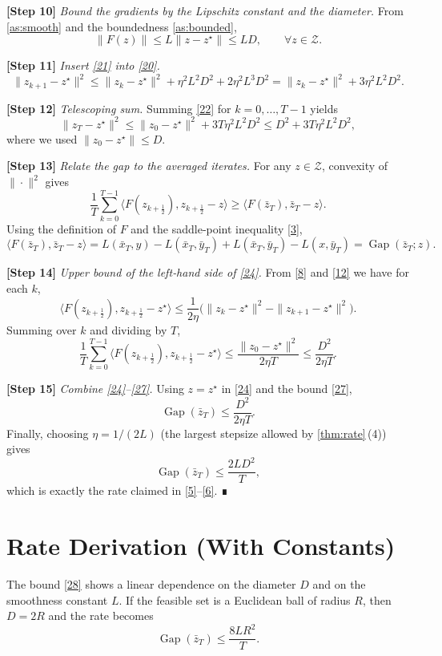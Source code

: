 \documentclass{article}
\newcommand{\gap}{\operatorname{Gap}}
\begin{document}
\noindent\textbf{[Step 10]} \emph{Bound the gradients by the Lipschitz constant and the diameter.}  
From \eqref{as:smooth} and the boundedness \eqref{as:bounded},
\[
\|F(z)\|\le L\|z-z^{\star}\|\le LD,\qquad\forall z\in\mathcal{Z}.
\tag{21}
\]

\noindent\textbf{[Step 11]} \emph{Insert \eqref{21} into \eqref{20}.}  
\[
\|z_{k+1}-z^{\star}\|^{2}
\le\|z_{k}-z^{\star}\|^{2}
   +\eta^{2}L^{2}D^{2}+2\eta^{2}L^{3}D^{2}
   =\|z_{k}-z^{\star}\|^{2}+3\eta^{2}L^{2}D^{2}.
\tag{22}
\]

\noindent\textbf{[Step 12]} \emph{Telescoping sum.}  
Summing \eqref{22} for $k=0,\dots,T-1$ yields
\[
\|z_{T}-z^{\star}\|^{2}
\le\|z_{0}-z^{\star}\|^{2}+3T\eta^{2}L^{2}D^{2}
\le D^{2}+3T\eta^{2}L^{2}D^{2},
\tag{23}
\]
where we used $\|z_{0}-z^{\star}\|\le D$.

\noindent\textbf{[Step 13]} \emph{Relate the gap to the averaged iterates.}  
For any $z\in\mathcal{Z}$, convexity of $\|\cdot\|^{2}$ gives
\[
\frac{1}{T}\sum_{k=0}^{T-1}\langle F(z_{k+\frac12}),z_{k+\frac12}-z\rangle
\ge\langle F(\bar z_{T}),\bar z_{T}-z\rangle.
\tag{24}
\]
Using the definition of $F$ and the saddle‑point inequality \eqref{3},
\[
\langle F(\bar z_{T}),\bar z_{T}-z\rangle
= L(\bar x_{T},y)-L(\bar x_{T},\bar y_{T})
   +L(\bar x_{T},\bar y_{T})-L(x,\bar y_{T})
   =\gap(\bar z_{T};z).
\tag{25}
\]

\noindent\textbf{[Step 14]} \emph{Upper bound of the left‑hand side of \eqref{24}.}  
From \eqref{8} and \eqref{12} we have for each $k$,
\[
\langle F(z_{k+\frac12}),z_{k+\frac12}-z^{\star}\rangle
\le\frac{1}{2\eta}\bigl(\|z_{k}-z^{\star}\|^{2}
                         -\|z_{k+1}-z^{\star}\|^{2}\bigr).
\tag{26}
\]
Summing over $k$ and dividing by $T$,
\[
\frac{1}{T}\sum_{k=0}^{T-1}\langle F(z_{k+\frac12}),z_{k+\frac12}-z^{\star}\rangle
\le\frac{\|z_{0}-z^{\star}\|^{2}}{2\eta T}
\le\frac{D^{2}}{2\eta T}.
\tag{27}
\]

\noindent\textbf{[Step 15]} \emph{Combine \eqref{24}–\eqref{27}.}  
Using $z=z^{\star}$ in \eqref{24} and the bound \eqref{27},
\[
\gap(\bar z_{T})\le\frac{D^{2}}{2\eta T}.
\tag{28}
\]
Finally, choosing $\eta=1/(2L)$ (the largest stepsize allowed by \eqref{thm:rate}\,(4)) gives
\[
\gap(\bar z_{T})\le\frac{2L D^{2}}{T},
\]
which is exactly the rate claimed in \eqref{5}–\eqref{6}. ∎

\section*{Rate Derivation (With Constants)}
The bound \eqref{28} shows a linear dependence on the diameter $D$ and on the smoothness constant $L$.  
If the feasible set is a Euclidean ball of radius $R$, then $D=2R$ and the rate becomes
\[
\gap(\bar z_{T})\le\frac{8LR^{2}}{T}.
\]
\end{document}
